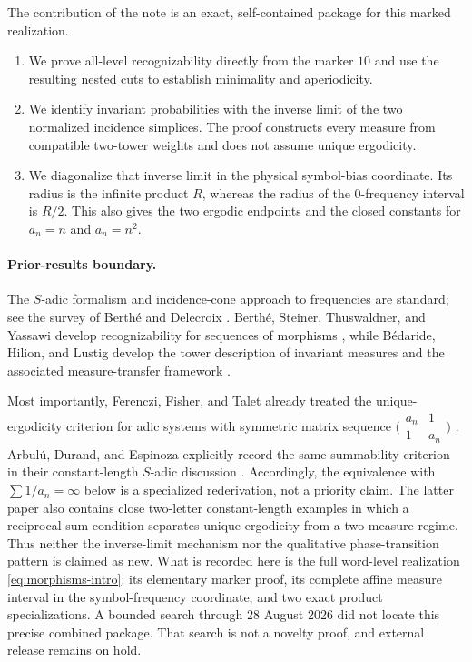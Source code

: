 \documentclass[11pt,a4paper]{amsart}
\theoremstyle{definition}
\theoremstyle{remark}
\begin{document}
The contribution of the note is an exact, self-contained package for this
marked realization.
\begin{enumerate}
\item We prove all-level recognizability directly from the marker $10$ and
  use the resulting nested cuts to establish minimality and aperiodicity.
\item We identify invariant probabilities with the inverse limit of the two
  normalized incidence simplices.  The proof constructs every measure from
  compatible two-tower weights and does not assume unique ergodicity.
\item We diagonalize that inverse limit in the physical symbol-bias
  coordinate.  Its radius is the infinite product $R$, whereas the radius of
  the $0$-frequency interval is $R/2$.  This also gives the two ergodic
  endpoints and the closed constants for $a_n=n$ and $a_n=n^2$.
\end{enumerate}

\paragraph{Prior-results boundary.}
The $S$-adic formalism and incidence-cone approach to frequencies are
standard; see the survey of Berth\'e and Delecroix
\cite{BertheDelecroix2014}.  Berth\'e, Steiner, Thuswaldner, and Yassawi
develop recognizability for sequences of morphisms
\cite{BertheSteinerThuswaldnerYassawi2019}, while B\'edaride, Hilion, and
Lustig develop the tower description of invariant measures
\cite{BedarideHilionLustig2021} and the associated measure-transfer
framework \cite{BedarideHilionLustig2024}.

Most importantly, Ferenczi, Fisher, and Talet already treated the
unique-ergodicity criterion for adic systems with symmetric matrix sequence
\(\bigl(\begin{smallmatrix}a_n&1\\1&a_n\end{smallmatrix}\bigr)\)
\cite{FerencziFisherTalet2009}.  Arbul\'u, Durand, and Espinoza explicitly
record the same summability criterion in their constant-length $S$-adic
discussion \cite{ArbuluDurandEspinoza2024}.  Accordingly, the equivalence
with $\sum1/a_n=\infty$ below is a specialized rederivation, not a priority
claim.  The latter paper also contains close two-letter constant-length
examples in which a reciprocal-sum condition separates unique ergodicity
from a two-measure regime.  Thus neither the inverse-limit mechanism nor the
qualitative phase-transition pattern is claimed as new.  What is recorded
here is the full word-level realization
\eqref{eq:morphisms-intro}: its elementary marker proof, its complete affine
measure interval in the symbol-frequency coordinate, and two exact product
specializations.  A bounded search through 28 August 2026 did not locate this
precise combined package.  That search is not a novelty proof, and external
release remains on hold.
\end{document}
